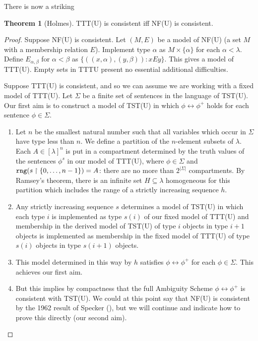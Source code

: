 \documentclass{article}
\theoremstyle{definition}
\newtheorem{theorem}{Theorem}[section]
\theoremstyle{remark}
\begin{document}
{There is now a striking

\begin{theorem}[Holmes]\label{thm:nfufromtttu}
  TTT(U) is consistent iff NF(U) is consistent.
\end{theorem}
\begin{proof}
Suppose NF(U) is consistent.  Let $(M,E)$ be a model of NF(U) (a set $M$ with a membership relation $E$).  Implement type $\alpha$ as $M \times \{\alpha\}$ for
each $\alpha<\lambda$.  Define $E_{\alpha,\beta}$ for $\alpha<\beta$ as $\{((x,\alpha),(y,\beta)):xEy\}$.  This gives a model of TTT(U).   Empty sets in TTTU present no essential additional difficulties.

Suppose TTT(U) is consistent, and so we can assume we are working with a fixed model of TTT(U).  Let $\Sigma$ be a finite set of sentences in the language of TST(U).  Our first aim is to construct a model of TST(U) in which $\phi \leftrightarrow \phi^+$ holds for each sentence $\phi \in \Sigma$.
\begin{enumerate}
\item Let $n$ be the smallest natural number such that all variables which occur in $\Sigma$ have type less than $n$. We define a partition of the $n$-element subsets of $\lambda$.  Each $A \in [\lambda]^n$ is put in a compartment
determined by the truth values of the sentences $\phi^s$ in our model of TTT(U), where $\phi \in \Sigma$ and ${\tt rng}(s \restriction \{0,\ldots,n-1\}) = A$:  there are no more than $2^{|\Sigma|}$ compartments.  By Ramsey's theorem, there is an infinite set $H \subseteq \lambda$ homogeneous for this partition  which includes the range of a strictly increasing sequence $h$.

\item Any strictly increasing sequence $s$ determines a model of TST(U) in which each type $i$ is implemented as type $s(i)$ of our fixed model of TTT(U)  and membership in the derived model of TST(U) of type $i$ objects in type $i+1$ objects is implemented as membership in the fixed model of TTT(U) of type $s(i)$ objects in type $s(i+1)$ objects.

\item This model determined in this way by $h$ satisfies  $\phi \leftrightarrow \phi^+$ for each $\phi \in \Sigma$.   This achieves our first aim.

\item But this implies by compactness that the full Ambiguity Scheme $\phi \leftrightarrow \phi^+$ is consistent with TST(U).  We could at this point say that  NF(U) is consistent by the 1962 result of Specker (\cite{ambiguity}), but we will continue and indicate how to prove this directly (our second aim).


\end{enumerate}
\end{proof}}
\end{document}
